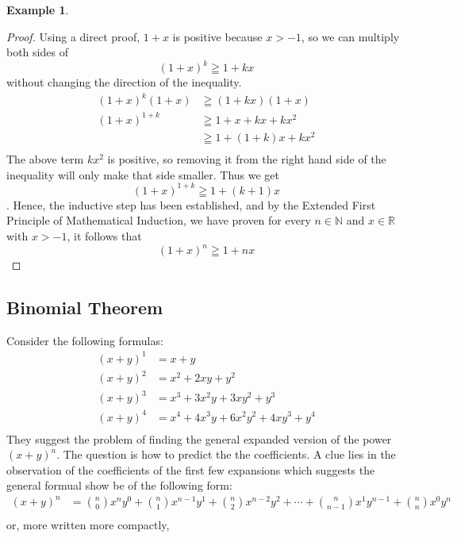 \documentclass{book}
\theoremstyle{definition}
\newtheorem{example}{Example}[definition]
\theoremstyle{remark}
\newcommand{\bb}[1]{\mathbb{#1}}
\begin{document}
\begin{example}
\begin{proof}
        Using a direct proof, $1 + x$ is positive because $x > -1$, so we can multiply both sides of $$ (1+x)^k \geqq 1 + kx $$ without changing the direction of the inequality. 
            \begin{align*}
                (1+x)^k(1+x)    & \geqq (1 + kx)(1+x) \\
                (1+x)^{1+k}     & \geqq 1 + x + kx + kx^2 \\
                                & \geqq 1 + (1 + k)x + kx^2 \\   
            \end{align*}
        The above term $kx^2$ is positive, so removing it from the right hand side of the inequality will only make that side smaller. Thus we get $$ (1+x)^{1+k} \geqq 1 + (k + 1)x $$. Hence, the inductive step has been established, and by the Extended First Principle of Mathematical Induction, we have proven for every $n \in \bb{N}$ and $x \in \bb{R}$ with $x > -1$, it follows that 
        \begin{equation*}
            (1+x)^n \geqq 1 + nx              
        \end{equation*}
 
\end{proof}
\end{example}





\newpage
\subsection{Binomial Theorem}

Consider the following formulas:
    \begin{align*}
        (x + y)^1 & = x + y \\
        (x + y)^2 & = x^2 + 2xy + y^2 \\
        (x + y)^3 & = x^3 + 3x^2y + 3xy^2 + y^3 \\
        (x + y)^4 & = x^4 + 4x^3y + 6x^2y^2 + 4xy^3 + y^4 \\
    \end{align*}
They suggest the problem of finding the general expanded version of the power $(x+y)^n$. The question is how to predict the the coefficients. A clue lies in the observation of the coefficients of the first few expansions which suggests the general formual show be of the following form: 
    \begin{align*}
        (x + y)^n & = {\binom{n}{0}}x^ny^0 + {\binom{n}{1}}x^{n-1}y^1 + {\binom{n}{2}}x^{n-2}y^2 + \cdots + {\binom{n}{n-1}}x^1y^{n-1} + {\binom{n}{n}}x^0y^n \\
    \end{align*}
or, more written more compactly, 
\end{document}
